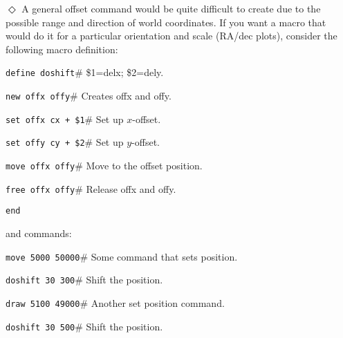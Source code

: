 \indent$\Diamond$
A general offset command would be quite difficult to create due
to the possible range and direction of world coordinates.
If you want a macro that would do it for a particular orientation
and scale (\eg RA/dec plots), consider the following macro definition:
\begin{wiplist}%
  \item {\tt define doshift}\hfill\# \$1=delx; \$2=dely.
\samepage
  \item [\wipd] {\tt new offx offy}\hfill\# Creates offx and offy.
  \item [\wipd] {\tt set offx cx + \$1}\hfill\# Set up $x$-offset.
  \item [\wipd] {\tt set offy cy + \$2}\hfill\# Set up $y$-offset.
  \item [\wipd] {\tt move offx offy}\hfill\# Move to the offset position.
  \item [\wipd] {\tt free offx offy}\hfill\# Release offx and offy.
  \item [\wipd] {\tt end}
\end{wiplist}
and commands:
\begin{wiplist}%
  \item {\tt move 5000 50000}\hfill\# Some command that sets position.
\samepage
  \item {\tt doshift 30 300}\hfill\# Shift the position.
  \item {\tt draw 5100 49000}\hfill\# Another set position command.
  \item {\tt doshift 30 500}\hfill\# Shift the position.
\end{wiplist}

